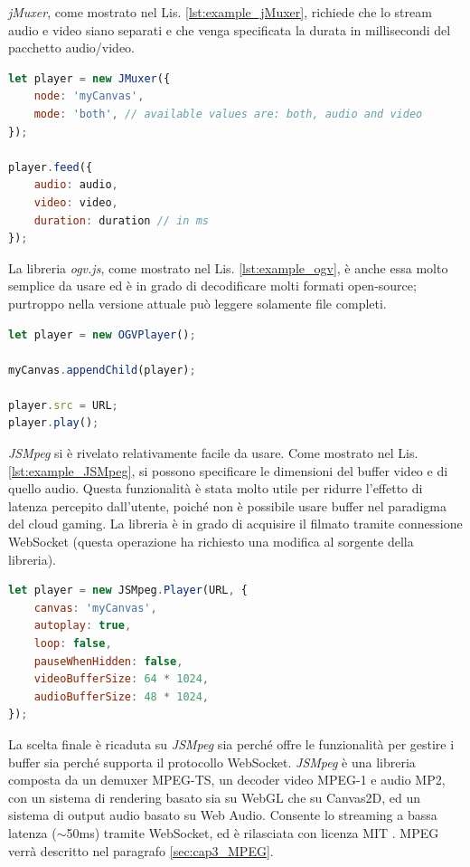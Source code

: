 \textit{jMuxer}, come mostrato nel Lis. \ref{lst:example_jMuxer}, richiede che lo stream audio e video siano separati e che venga specificata la durata in millisecondi del pacchetto audio/video.
 
\begin{lstlisting}[language=JavaScript, caption=Esempio di utilizzo di jMuxer, label={lst:example_jMuxer}]
let player = new JMuxer({
	node: 'myCanvas',
	mode: 'both', // available values are: both, audio and video
});

player.feed({
	audio: audio,
	video: video,
	duration: duration // in ms
});
\end{lstlisting}

La libreria \textit{ogv.js}, come mostrato nel Lis. \ref{lst:example_ogv}, è anche essa molto semplice da usare ed è in grado di decodificare molti formati open-source; purtroppo nella versione attuale può leggere solamente file completi.
 
\begin{lstlisting}[language=JavaScript, caption=Esempio di utilizzo di ogv.js, label={lst:example_ogv}]
let player = new OGVPlayer();

myCanvas.appendChild(player);

player.src = URL;
player.play();
\end{lstlisting}

\textit{JSMpeg} si è rivelato relativamente facile da usare. Come mostrato nel Lis. \ref{lst:example_JSMpeg}, si possono specificare le dimensioni del buffer video e di quello audio. Questa funzionalità è stata molto utile per ridurre l'effetto di latenza percepito dall'utente, poiché non è possibile usare buffer nel paradigma del cloud gaming. La libreria è in grado di acquisire il filmato tramite connessione WebSocket (questa operazione ha richiesto una modifica al sorgente della libreria).

\begin{lstlisting}[language=JavaScript, caption=Esempio di utilizzo di JSMpeg, label={lst:example_JSMpeg}]
let player = new JSMpeg.Player(URL, {
	canvas: 'myCanvas',
	autoplay: true,
	loop: false,
	pauseWhenHidden: false,
	videoBufferSize: 64 * 1024,
	audioBufferSize: 48 * 1024,
});
\end{lstlisting}

La scelta finale è ricaduta su \textit{JSMpeg} sia perché offre le funzionalità per gestire i buffer sia perché supporta il protocollo WebSocket. \textit{JSMpeg} è una libreria composta da un demuxer MPEG-TS, un decoder video MPEG-1 e audio MP2, con un sistema di rendering basato sia su WebGL che su Canvas2D, ed un sistema di output audio basato su Web Audio. Consente lo streaming a bassa latenza ($\sim$50ms) tramite WebSocket, ed è rilasciata con licenza MIT \parencite{JSMpeg}. MPEG verrà descritto nel paragrafo \ref{sec:cap3_MPEG}.




